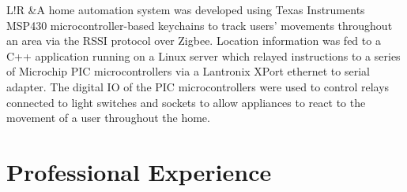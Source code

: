 \documentclass[12pt]{article}
\newcommand\VRule{\color{lightgray}\vrule width 0.5pt}
\begin{document}
\begin{longtable}{L!{\VRule}R}
&A home automation system was developed using Texas Instruments MSP430 microcontroller-based keychains to track users' movements throughout an area via the RSSI protocol over Zigbee. Location information was fed to a C++ application running on a Linux server which relayed instructions to a series of Microchip PIC microcontrollers via a Lantronix XPort ethernet to serial adapter. The digital IO of the PIC microcontrollers were used to control relays connected to light switches and sockets to allow appliances to react to the movement of a user throughout the home.\\

\end{longtable}

\section*{Professional Experience}
\end{document}
